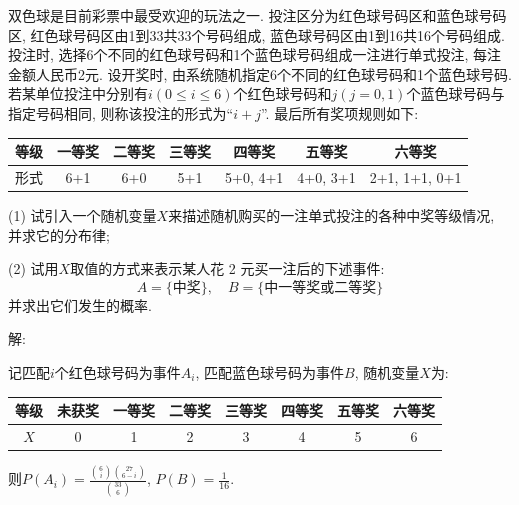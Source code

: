 \documentclass[standard]{ExBook}
\begin{document}
\begin{qitems}
    \begin{bbox}
    \begin{shaded}
        \qitem
双色球是目前彩票中最受欢迎的玩法之一. 投注区分为红色球号码区和蓝色球号码区, 红色球号码区由1到33共33个号码组成, 蓝色球号码区由1到16共16个号码组成.投注时, 选择6个不同的红色球号码和1个蓝色球号码组成一注进行单式投注, 每注金额人民币2元. 设开奖时, 由系统随机指定6个不同的红色球号码和1个蓝色球号码. 若某单位投注中分别有\( i (0 \le i \le 6) \)个红色球号码和\( j (j = 0, 1) \)个蓝色球号码与指定号码相同, 则称该投注的形式为``\( i+j \)''. 最后所有奖项规则如下:
\begin{center}
\setlength{\tabcolsep}{14pt}
\begin{tabular}{c|c|c|c|c|c|c}
\hline
等级 & 一等奖 & 二等奖 & 三等奖 & 四等奖 & 五等奖 & 六等奖 \\
\hline
形式 & 6+1 & 6+0 & 5+1 & 5+0, 4+1 & 4+0, 3+1 & 2+1, 1+1, 0+1 \\
\hline
\end{tabular}
\end{center}
(1) 试引入一个随机变量\( X \)来描述随机购买的一注单式投注的各种中奖等级情况, 并求它的分布律;

(2) 试用\( X \)取值的方式来表示某人花 2 元买一注后的下述事件:
\[
A = \{\text{中奖}\}, \quad B = \{\text{中一等奖或二等奖}\}
\]
并求出它们发生的概率.
    \end{shaded}
    \end{bbox}

\vspace{-5em}

    \begin{bbox}
解: 

记匹配$i$个红色球号码为事件$A_{i}$, 匹配蓝色球号码为事件$B$, 随机变量$X$为:
\begin{center}
\setlength{\tabcolsep}{13pt}
\begin{tabular}{c|c|c|c|c|c|c|c}
\hline
等级 & 未获奖 & 一等奖 & 二等奖 & 三等奖 & 四等奖 & 五等奖 & 六等奖 \\
\hline
$X$ & 0 & 1 & 2 & 3 & 4 & 5 & 6 \\
\hline
\end{tabular}
\end{center}
则$P(A_{i})=\displaystyle\frac{\binom{6}{i}\binom{27}{6-i}}{\binom{33}{6}}$, $P(B)=\displaystyle\frac{1}{16}$.


\end{bbox}
\end{qitems}
\end{document}
